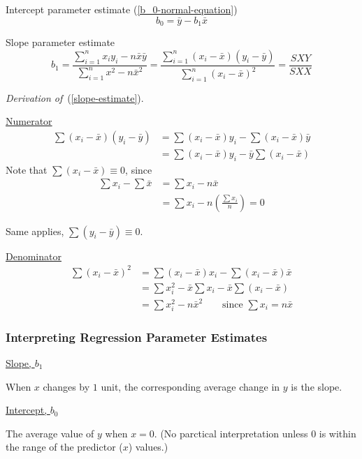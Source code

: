 \documentclass[11pt]{article}
\theoremstyle{definition}
\numberwithin{equation}{section}
\begin{document}
Intercept parameter estimate (\ref{b_0-normal-equation})
\begin{equation}
  b_0 = \bar{y} - b_1\bar{x}
\end{equation}

Slope parameter estimate
\begin{equation}\label{slope-estimate}
  b_1 = \frac{\sum^n_{i=1}x_iy_i - n\bar{x}\bar{y}}{\sum^n_{i=1} x^2 - n\bar{x}^2}=\frac{\sum^n_{i=1}(x_i-\bar{x})(y_i-\bar{y})}{\sum^n_{i=1}(x_i-\bar{x})^2}=\frac{SXY}{SXX}
\end{equation}

\begin{writenotes}
  \textit{Derivation of}~(\ref{slope-estimate}).

\underline{Numerator}
  \begin{align*}
    \sum(x_i - \bar{x})(y_i - \bar{y}) &= \sum(x_i - \bar{x})y_i - \sum(x_i - \bar{x})\bar{y}\\
    &= \sum(x_i - \bar{x})y_i - \bar{y}\sum(x_i - \bar{x})
  \end{align*}
  Note that $\sum(x_i - \bar{x})\equiv 0$, since
  \begin{align*}
  \sum x_i - \sum\bar{x}
    &= \sum{x_i} - n\bar{x}\\
    &= \sum x_i - n\left( \frac{\sum x_i}{n} \right) = 0
  \end{align*}

Same applies, $\sum(y_i - \bar{y}) \equiv 0$.

\underline{Denominator}
\begin{align*}
  \sum(x_i - \bar{x})^2 &= \sum(x_i - \bar{x})x_i - \sum(x_i - \bar{x})\bar{x}\\
  &= \sum x_i^2 - \bar{x}\sum x_i - \bar{x}\sum(x_i - \bar{x})\\
  &=\sum x_i^2 - n\bar{x}^2\qquad\text{since }\sum x_i=n\bar{x}
\end{align*}
\end{writenotes}

\subsubsection{Interpreting Regression Parameter Estimates}

\underline{Slope, $b_1$}

When $x$ changes by $1$ unit, the corresponding average change in $y$ is the slope.

\underline{Intercept, $b_0$}

The average value of $y$ when $x = 0$. (No parctical interpretation unless $0$ is within the range of the predictor ($x$) values.)
\end{document}

